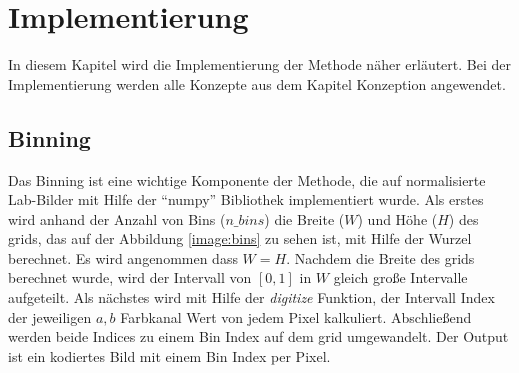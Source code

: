 \chapter{Implementierung}
In diesem Kapitel wird die Implementierung der Methode näher erläutert. Bei der Implementierung werden alle Konzepte aus dem
Kapitel Konzeption angewendet.



  

\section{Binning}
Das Binning ist eine wichtige Komponente der Methode, die auf normalisierte Lab-Bilder mit Hilfe der ``numpy'' Bibliothek implementiert wurde. 
Als erstes wird 
anhand der Anzahl von Bins ($n\_bins$) die Breite ($W$) und Höhe ($H$) des \gls{grid}s, das auf der Abbildung \ref{image:bins} zu sehen ist,
mit Hilfe der Wurzel berechnet. Es wird angenommen dass $W = H$.
Nachdem die Breite des \gls{grid}s berechnet wurde, wird der Intervall von $[0, 1]$ in $W$ gleich große Intervalle aufgeteilt. Als nächstes
wird mit Hilfe der \textit{digitize} Funktion, der Intervall Index der jeweiligen $a, b$ Farbkanal Wert von jedem Pixel kalkuliert. 
Abschließend werden beide Indices zu einem Bin Index auf dem \gls{grid} umgewandelt. Der Output ist ein kodiertes Bild mit einem Bin Index per Pixel.
\\

